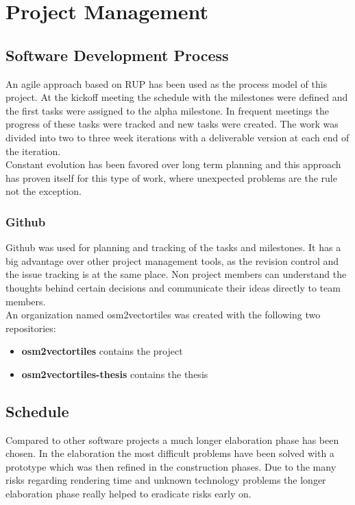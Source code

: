 \chapter{Project Management}\label{project-management}

\section{Software Development Process}

An agile approach based on RUP has been used as the process model of this project. At the kickoff meeting the schedule with the milestones were defined and the first tasks were assigned to the alpha milestone. In frequent meetings the progress of these tasks were tracked and new tasks were created. The work was divided into two to three week iterations with a deliverable version at each end of the iteration.\\
Constant evolution has been favored over long term planning and this approach has proven itself for this type of work, where unexpected problems are the rule not the exception.

\subsection{Github}\label{github}
Github was used for planning and tracking of the tasks and milestones. It has a big advantage over other project management tools, as the revision control and the issue tracking is at the same place. Non project members can understand the thoughts behind certain decisions and communicate their ideas directly to team members.\\
An organization named osm2vectortiles was created with the following two repositories:

\begin{itemize}
\item
  \textbf{osm2vectortiles} contains the project\cite{pm_1_github_2015}
\item
  \textbf{osm2vectortiles-thesis} contains the thesis\cite{pm_2_github_2015}
\end{itemize}

\section{Schedule}

Compared to other software projects a much longer elaboration phase has been chosen. In the elaboration the most difficult problems have been solved with a prototype which was then refined in the construction phases. Due to the many risks regarding rendering time and unknown technology problems the longer elaboration phase really helped to eradicate risks early on.

